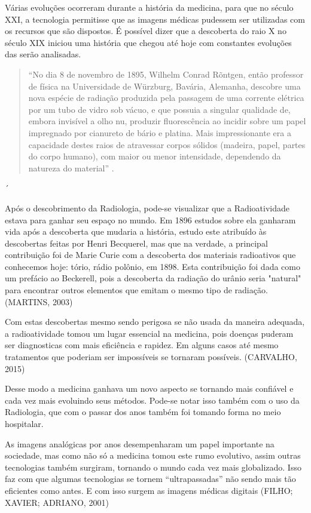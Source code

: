 \documentclass[
	12pt,				%
	openright,			%
	twoside,			%
	a4paper,			%
	english,			%
	french,				%
	spanish,			%
	brazil				%
	]{abntex2}
\begin{document}
Várias evoluções ocorreram durante a história da medicina, para que no século XXI, a tecnologia permitisse que as imagens médicas pudessem ser utilizadas com os recursos que são dispostos. É possível dizer que a descoberta do raio X no século XIX iniciou uma história que chegou até hoje com constantes evoluções das serão analisadas. 

\begin{quote}
``No dia 8 de novembro de 1895, Wilhelm Conrad Rõntgen, então professor de física na Universidade de Würzburg, Bavária, Alemanha, descobre uma nova espécie de radiação produzida pela passagem de uma corrente elétrica por um tubo de vidro sob vácuo, e que possuia a singular qualidade de, embora invisível a olho nu, produzir fluorescência ao incidir sobre um papel impregnado por cianureto de bário e platina. Mais impressionante era a capacidade destes raios de atravessar corpos sólidos (madeira, papel, partes do corpo humano), com maior ou menor intensidade, dependendo da natureza do material'' \cite{ARRUDA, 1996, p. 1}.
\end{quote}
´

Após o descobrimento da Radiologia, pode-se visualizar que a Radioatividade estava para ganhar seu espaço no mundo. Em 1896 estudos sobre ela ganharam vida após a descoberta que mudaria a história, estudo este atribuído às descobertas feitas por Henri Becquerel, mas que na verdade, a principal contribuição foi de Marie Curie com a descoberta dos materiais radioativos que conhecemos hoje: tório, rádio polônio, em 1898. Esta contribuição foi dada como um prefácio ao Beckerell, pois a descoberta da radiação do urânio seria "natural" para encontrar outros elementos que emitam o mesmo tipo de radiação. (MARTINS, 2003)


Com estas descobertas mesmo sendo perigosa se não usada da maneira adequada, a radioatividade tomou um lugar essencial na medicina, pois doenças puderam ser diagnosticas com mais eficiência e rapidez. Em alguns casos até mesmo tratamentos que poderiam ser impossíveis se tornaram possíveis. (CARVALHO, 2015)

Desse modo a medicina ganhava um novo aspecto se tornando mais confiável e cada vez mais evoluindo seus métodos. Pode-se notar isso também com o uso da Radiologia, que com o passar dos anos também foi tomando forma no meio hospitalar.

As imagens analógicas por anos desempenharam um papel importante na sociedade, mas como não só a medicina tomou este rumo evolutivo, assim outras tecnologias também surgiram, tornando o mundo cada vez mais globalizado. Isso faz com que algumas tecnologias se tornem “ultrapassadas” não sendo mais tão eficientes como antes. E com isso surgem as imagens médicas digitais (FILHO; XAVIER; ADRIANO, 2001)
\end{document}
